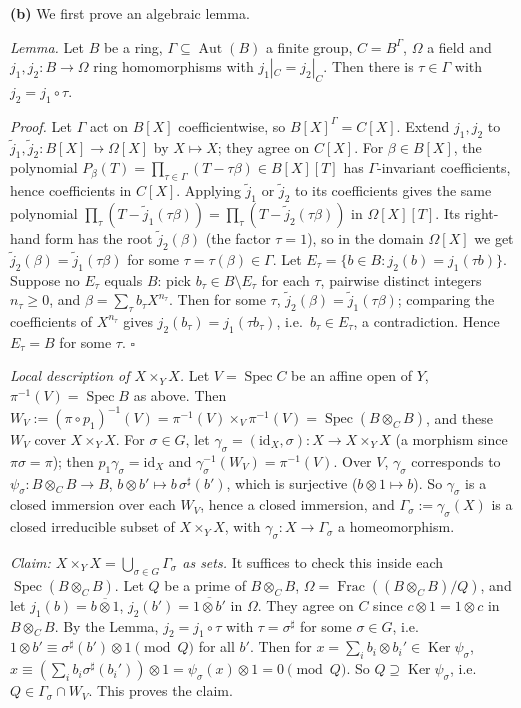 \documentclass[11pt]{article}
\begin{document}
\textbf{(b)} We first prove an algebraic lemma.

\emph{Lemma.} Let $B$ be a ring, $\Gamma\subseteq\operatorname{Aut}(B)$ a finite group, $C=B^\Gamma$, $\Omega$ a field and $j_1,j_2:B\to\Omega$ ring homomorphisms with $j_1|_C=j_2|_C$. Then there is $\tau\in\Gamma$ with $j_2=j_1\circ\tau$.

\emph{Proof.} Let $\Gamma$ act on $B[X]$ coefficientwise, so $B[X]^\Gamma=C[X]$. Extend $j_1,j_2$ to $\tilde j_1,\tilde j_2:B[X]\to\Omega[X]$ by $X\mapsto X$; they agree on $C[X]$. For $\beta\in B[X]$, the polynomial $P_\beta(T)=\prod_{\tau\in\Gamma}(T-\tau\beta)\in B[X][T]$ has $\Gamma$-invariant coefficients, hence coefficients in $C[X]$. Applying $\tilde j_1$ or $\tilde j_2$ to its coefficients gives the same polynomial $\prod_\tau(T-\tilde j_1(\tau\beta))=\prod_\tau(T-\tilde j_2(\tau\beta))$ in $\Omega[X][T]$. Its right-hand form has the root $\tilde j_2(\beta)$ (the factor $\tau=1$), so in the domain $\Omega[X]$ we get $\tilde j_2(\beta)=\tilde j_1(\tau\beta)$ for some $\tau=\tau(\beta)\in\Gamma$. Let $E_\tau=\{b\in B:j_2(b)=j_1(\tau b)\}$. Suppose no $E_\tau$ equals $B$: pick $b_\tau\in B\setminus E_\tau$ for each $\tau$, pairwise distinct integers $n_\tau\ge0$, and $\beta=\sum_\tau b_\tau X^{n_\tau}$. Then for some $\tau$, $\tilde j_2(\beta)=\tilde j_1(\tau\beta)$; comparing the coefficients of $X^{n_\tau}$ gives $j_2(b_\tau)=j_1(\tau b_\tau)$, i.e.\ $b_\tau\in E_\tau$, a contradiction. Hence $E_\tau=B$ for some $\tau$. $\square$

\emph{Local description of $X\times_YX$.} Let $V=\operatorname{Spec}C$ be an affine open of $Y$, $\pi^{-1}(V)=\operatorname{Spec}B$ as above. Then $W_V:=(\pi\circ p_1)^{-1}(V)=\pi^{-1}(V)\times_V\pi^{-1}(V)=\operatorname{Spec}(B\otimes_CB)$, and these $W_V$ cover $X\times_YX$. For $\sigma\in G$, let $\gamma_\sigma=(\mathrm{id}_X,\sigma):X\to X\times_YX$ (a morphism since $\pi\sigma=\pi$); then $p_1\gamma_\sigma=\mathrm{id}_X$ and $\gamma_\sigma^{-1}(W_V)=\pi^{-1}(V)$. Over $V$, $\gamma_\sigma$ corresponds to $\psi_\sigma:B\otimes_CB\to B$, $b\otimes b'\mapsto b\,\sigma^\sharp(b')$, which is surjective ($b\otimes1\mapsto b$). So $\gamma_\sigma$ is a closed immersion over each $W_V$, hence a closed immersion, and $\Gamma_\sigma:=\gamma_\sigma(X)$ is a closed irreducible subset of $X\times_YX$, with $\gamma_\sigma\!:X\to\Gamma_\sigma$ a homeomorphism.

\emph{Claim: $X\times_YX=\bigcup_{\sigma\in G}\Gamma_\sigma$ as sets.} It suffices to check this inside each $\operatorname{Spec}(B\otimes_CB)$. Let $Q$ be a prime of $B\otimes_CB$, $\Omega=\operatorname{Frac}((B\otimes_CB)/Q)$, and let $j_1(b)=\overline{b\otimes1}$, $j_2(b')=\overline{1\otimes b'}$ in $\Omega$. They agree on $C$ since $c\otimes1=1\otimes c$ in $B\otimes_CB$. By the Lemma, $j_2=j_1\circ\tau$ with $\tau=\sigma^\sharp$ for some $\sigma\in G$, i.e.\ $1\otimes b'\equiv\sigma^\sharp(b')\otimes1\pmod Q$ for all $b'$. Then for $x=\sum_ib_i\otimes b_i'\in\operatorname{Ker}\psi_\sigma$, $x\equiv(\sum_ib_i\sigma^\sharp(b_i'))\otimes1=\psi_\sigma(x)\otimes 1=0\pmod Q$. So $Q\supseteq\operatorname{Ker}\psi_\sigma$, i.e.\ $Q\in\Gamma_\sigma\cap W_V$. This proves the claim.
\end{document}
